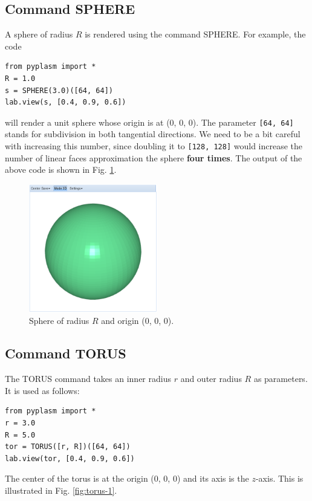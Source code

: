 \documentclass[article,A4,12pt]{llncs}
\begin{document}
\subsection{Command SPHERE}

A sphere of radius $R$ is rendered using the command SPHERE.
For example, the code

\begin{verbatim}
from pyplasm import *
R = 1.0
s = SPHERE(3.0)([64, 64])
lab.view(s, [0.4, 0.9, 0.6])
\end{verbatim}
will render a unit sphere whose origin is at (0, 0, 0). 
The parameter {\tt [64, 64]} stands for 
subdivision in both tangential directions. We need to be a bit 
careful with increasing this number, since doubling it to 
{\tt [128, 128]} would increase 
the number of linear faces approximation the sphere {\bf four times}.
The output of the above code is shown in Fig. \ref{fig:sphere-1}.

\begin{figure}[!ht]
\begin{center}
\includegraphics[width=0.5\textwidth]{img/sphere-1.png}
\end{center}
\vspace{-2mm}
\caption{Sphere of radius $R$ and origin (0, 0, 0).}
\label{fig:sphere-1}
\end{figure}


\subsection{Command TORUS}

The TORUS command takes an inner radius $r$ and outer radius 
$R$ as parameters. It is used as follows:
\begin{verbatim}
from pyplasm import *
r = 3.0
R = 5.0
tor = TORUS([r, R])([64, 64])
lab.view(tor, [0.4, 0.9, 0.6])
\end{verbatim}
The center of the torus is at the origin (0, 0, 0) and its axis
is the $z$-axis. This is illustrated in Fig. \ref{fig:torus-1}.
\end{document}
